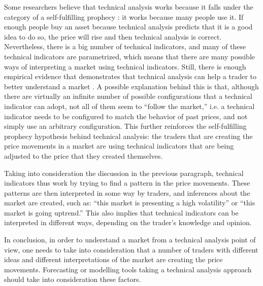 Some researchers believe that technical analysis works because it falls under
the category of a self-fulfilling prophecy \cite{Salganik2008}: it works
because many people use it. If enough people buy an asset because technical
analysis predicts that it is a good idea to do so, the price will rise and then
technical analysis is correct. Nevertheless, there is a big number of technical
indicators, and many of these technical indicators are parametrized, which means
that there are many possible ways of interpreting a market using technical
indicators. Still, there is enough empirical evidence that demonstrates that
technical analysis can help a trader to better understand a market
\cite{Achelis2000} \cite{Fund1992} \cite{Li1999}. 
A possible
explanation behind this is that, although there are virtually an infinite number
of possible configurations that a technical indicator can adopt, not all of them
seem to ``follow the market,'' i.e. a technical indicator needs to be configured
to match the behavior of past prices, and not simply use an arbitrary
configuration. This further reinforces the self-fulfilling prophecy hypothesis
behind technical analysis: the traders that are creating the price movements in
a market are using technical indicators that are being adjusted to the price
that they created themselves.

Taking into consideration the discussion in the previous paragraph, technical
indicators thus work by trying to find a pattern in the price movements. These
patterns are then interpreted in some way by traders, and inferences about the
market are created, such as: ``this market is presenting a high volatility'' or
``this market is going uptrend.'' This also implies that technical indicators can
be interpreted in different ways, depending on the trader's knowledge and
opinion.

In conclusion, in order to understand a market from a technical analysis point
of view, one needs to take into consideration that a number of traders with
different ideas and different interpretations of the market are creating the
price movements. Forecasting or modelling tools taking a technical analysis
approach should take into consideration these factors. %


